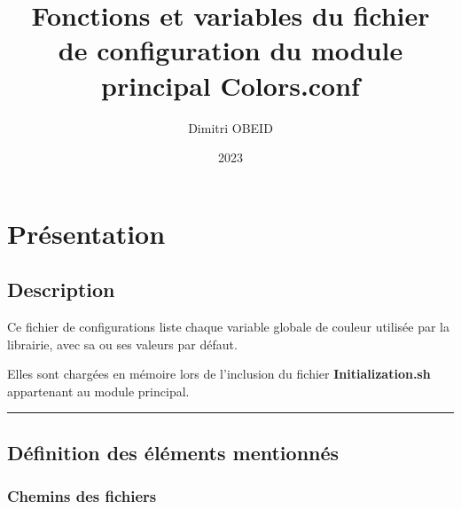 \documentclass[a4paper,10pt]{article}
\title{\color{sec1}Fonctions et variables du fichier \\de configuration du module \\principal \color{path}Colors.conf}\color{text}
\author{Dimitri OBEID}
\date{2023}
\begin{document}
    \maketitle
    \newpage

    \hypertarget{contents}{}
    \tableofcontents
    \newpage

    \color{sec1}
    \section{Présentation}\color{text}

    \color{sec2}
    \subsection{Description}\color{text}

    \begin{justify}
        Ce fichier de configurations liste chaque variable globale de couleur utilisée par la librairie, avec sa ou ses valeurs par défaut.
    \end{justify}

    \begin{justify}
        Elles sont chargées en mémoire lors de l'inclusion du fichier \textbf{\color{path}Initialization.sh} appartenant au module principal.
    \end{justify}



    \color{sec2}\par\noindent\rule{\textwidth}{0.4pt}\color{text}

    \color{sec2}
    \subsection{Définition des éléments mentionnés}\color{text}

    \color{sec3}
    \subsubsection{Chemins des fichiers}\color{text}
\end{document}

